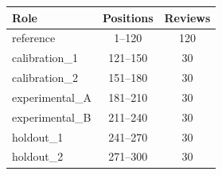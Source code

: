 \begin{tabular}{lcc}
\toprule
Role & Positions & Reviews \\
\midrule
reference & 1--120 & 120 \\
calibration_1 & 121--150 & 30 \\
calibration_2 & 151--180 & 30 \\
experimental_A & 181--210 & 30 \\
experimental_B & 211--240 & 30 \\
holdout_1 & 241--270 & 30 \\
holdout_2 & 271--300 & 30 \\
\bottomrule
\end{tabular}

